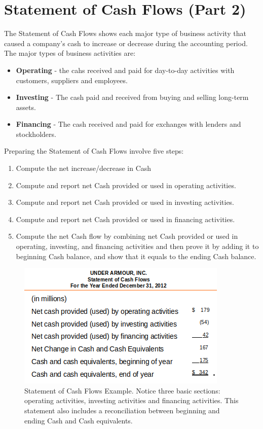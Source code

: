 \documentclass[../main.tex]{subfiles}
\begin{document}
	\section{Statement of Cash Flows (Part 2)}
	
	The Statement of Cash Flows shows each major type of business activity that 
	caused a company’s cash to increase or decrease during the accounting  
	period. The major types of business activities are:
	\begin{itemize}[noitemsep]
		\item \textbf{Operating} - the cahs received and paid for day-to-day 
		activities with customers, suppliers and employees.
		\item \textbf{Investing} - The cash paid and received from buying and 
		selling long-term assets.
		\item \textbf{Financing} - The cash received and paid for exchanges 
		with lenders and stockholders. 
	\end{itemize}

	Preparing the Statement of Cash Flows involve five steps:
	\begin{enumerate}[noitemsep]
		\item Compute the net increase/decrease in Cash
		\item Compute and report net Cash provided or used in operating 
		activities.
		\item Compute and report net Cash provided or used in investing 
		activities.
		\item Compute and report net Cash provided or used in financing
		activities.
		\item Compute the net Cash flow by combining net Cash provided or used 
		in operating, investing, and financing activities and then prove it by 
		adding it to beginning Cash balance, and show that it equals to the 
		ending Cash balance. 
	\end{enumerate}

	\begin{figure}[ht]
		\centering
		\includegraphics[width=0.7\columnwidth]{images/c11/cash_flows.png}
		\caption{\label{fig:soc_example} Statement of Cash Flows Example. 
		Notice three basic sections: operating activities, investing activities 
		and financing activities. This statement also includes a reconciliation 
		between beginning and ending Cash and Cash equivalents.}
	\end{figure}
	
\end{document}
